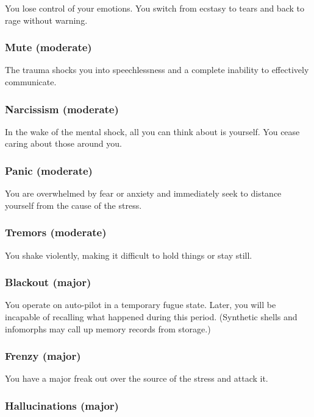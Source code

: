 You lose control of your emotions. You switch from ecstasy to tears and back to rage without warning.

\subsubsection{Mute (moderate)}

The trauma shocks you into speechlessness and a complete inability to effectively communicate.

\subsubsection{Narcissism (moderate)}

In the wake of the mental shock, all you can think about is yourself. You cease caring about those around you.

\subsubsection{Panic (moderate)}

You are overwhelmed by fear or anxiety and immediately seek to distance yourself from the cause of the stress.

\subsubsection{Tremors (moderate)}

You shake violently, making it difficult to hold things or stay still.

\subsubsection{Blackout (major)}

You operate on auto-pilot in a temporary fugue state. Later, you will be incapable of recalling what happened during this period. (Synthetic shells and infomorphs may call up memory records from storage.)

\subsubsection{Frenzy (major)}

You have a major freak out over the source of the stress and attack it.

\subsubsection{Hallucinations (major)}

